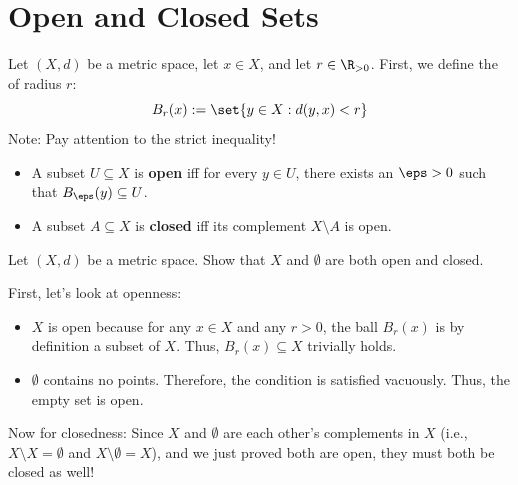 
\section{Open and Closed Sets}

Let $(X, d)$ be a metric space, let $x \in X$, and let $r \in \R_{>0}$. 
First, we define the \textcolor{eSaddleBrown}{} of radius $r$:
\[ B_r(x) := \set{ y \in X : d(y,x) < r } \]
\textcolor{eGray}{Note: Pay attention to the strict inequality!}

\begin{definition*}
\begin{itemize}
    \item A subset $U \subseteq X$ is \textcolor{eDarkGreen}{\textbf{open}} iff for every $y \in U$, there exists an $\eps > 0$ such that $B_\eps(y) \subseteq U$.
    \item A subset $A \subseteq X$ is \textcolor{eDarkRed}{\textbf{closed}} iff its complement $X \setminus A$ is open.
\end{itemize}
\end{definition*}

\begin{center}
\end{center}

\vspace{0.5cm}

\begin{exercise*}
Let $(X,d)$ be a metric space. Show that $X$ and $\emptyset$ are both open and closed.
\end{exercise*}

\begin{solution}
First, let's look at openness:
\begin{itemize}
    \item $X$ is open because for any $x \in X$ and any $r > 0$, the ball $B_r(x)$ is by definition a subset of $X$. Thus, $B_r(x) \subseteq X$ trivially holds.
    \item $\emptyset$ contains no points. Therefore, the condition  is satisfied vacuously. Thus, the empty set is open.
\end{itemize}
Now for closedness:
Since $X$ and $\emptyset$ are each other's complements in $X$ (i.e., $X \setminus X = \emptyset$ and $X \setminus \emptyset = X$), and we just proved both are open, they must both be closed as well!
\end{solution}

\hrulefill
